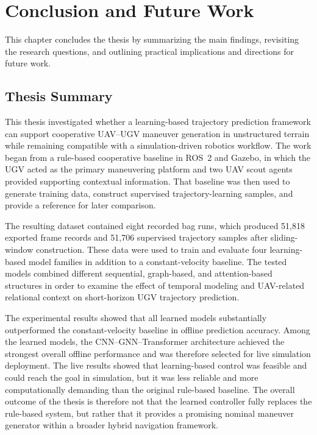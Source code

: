 
\chapter{Conclusion and Future Work}
\label{ch:conclusion}

This chapter concludes the thesis by summarizing the main findings, revisiting the research questions, and outlining practical implications and directions for future work.

\section{Thesis Summary}
This thesis investigated whether a learning-based trajectory prediction framework can support cooperative UAV--UGV maneuver generation in unstructured terrain while remaining compatible with a simulation-driven robotics workflow. The work began from a rule-based cooperative baseline in ROS~2 and Gazebo, in which the UGV acted as the primary maneuvering platform and two UAV scout agents provided supporting contextual information. That baseline was then used to generate training data, construct supervised trajectory-learning samples, and provide a reference for later comparison.

The resulting dataset contained eight recorded bag runs, which produced 51,818 exported frame records and 51,706 supervised trajectory samples after sliding-window construction. These data were used to train and evaluate four learning-based model families in addition to a constant-velocity baseline. The tested models combined different sequential, graph-based, and attention-based structures in order to examine the effect of temporal modeling and UAV-related relational context on short-horizon UGV trajectory prediction.

The experimental results showed that all learned models substantially outperformed the constant-velocity baseline in offline prediction accuracy. Among the learned models, the CNN--GNN--Transformer architecture achieved the strongest overall offline performance and was therefore selected for live simulation deployment. The live results showed that learning-based control was feasible and could reach the goal in simulation, but it was less reliable and more computationally demanding than the original rule-based baseline. The overall outcome of the thesis is therefore not that the learned controller fully replaces the rule-based system, but rather that it provides a promising nominal maneuver generator within a broader hybrid navigation framework.

